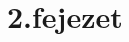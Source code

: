 \documentclass[tocnopagenum]{thesis-ekf}
\theoremstyle{definition}
\theoremstyle{remark}
\begin{document}

	\chapter*{2.fejezet}
\end{document}

